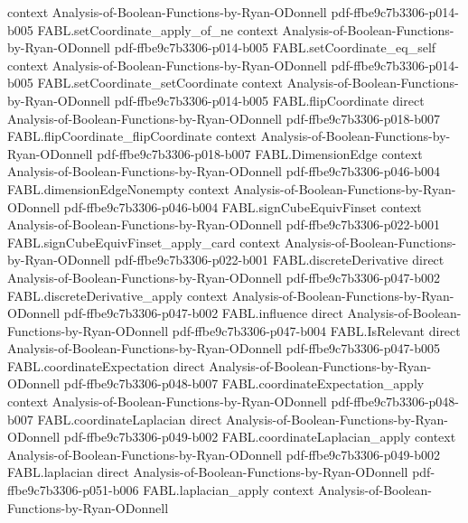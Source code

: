 \begin{theorem}
  {context}
  {Analysis-of-Boolean-Functions-by-Ryan-ODonnell}
  {pdf-ffbe9c7b3306-p014-b005}
\proofstep
  {FABL.setCoordinate_apply_of_ne}
  {context}
  {Analysis-of-Boolean-Functions-by-Ryan-ODonnell}
  {pdf-ffbe9c7b3306-p014-b005}
\proofstep
  {FABL.setCoordinate_eq_self}
  {context}
  {Analysis-of-Boolean-Functions-by-Ryan-ODonnell}
  {pdf-ffbe9c7b3306-p014-b005}
\proofstep
  {FABL.setCoordinate_setCoordinate}
  {context}
  {Analysis-of-Boolean-Functions-by-Ryan-ODonnell}
  {pdf-ffbe9c7b3306-p014-b005}
\proofstep
  {FABL.flipCoordinate}
  {direct}
  {Analysis-of-Boolean-Functions-by-Ryan-ODonnell}
  {pdf-ffbe9c7b3306-p018-b007}
\proofstep
  {FABL.flipCoordinate_flipCoordinate}
  {context}
  {Analysis-of-Boolean-Functions-by-Ryan-ODonnell}
  {pdf-ffbe9c7b3306-p018-b007}
\proofstep
  {FABL.DimensionEdge}
  {context}
  {Analysis-of-Boolean-Functions-by-Ryan-ODonnell}
  {pdf-ffbe9c7b3306-p046-b004}
\proofstep
  {FABL.dimensionEdgeNonempty}
  {context}
  {Analysis-of-Boolean-Functions-by-Ryan-ODonnell}
  {pdf-ffbe9c7b3306-p046-b004}
\proofstep
  {FABL.signCubeEquivFinset}
  {context}
  {Analysis-of-Boolean-Functions-by-Ryan-ODonnell}
  {pdf-ffbe9c7b3306-p022-b001}
\proofstep
  {FABL.signCubeEquivFinset_apply_card}
  {context}
  {Analysis-of-Boolean-Functions-by-Ryan-ODonnell}
  {pdf-ffbe9c7b3306-p022-b001}
\proofstep
  {FABL.discreteDerivative}
  {direct}
  {Analysis-of-Boolean-Functions-by-Ryan-ODonnell}
  {pdf-ffbe9c7b3306-p047-b002}
\proofstep
  {FABL.discreteDerivative_apply}
  {context}
  {Analysis-of-Boolean-Functions-by-Ryan-ODonnell}
  {pdf-ffbe9c7b3306-p047-b002}
\proofstep
  {FABL.influence}
  {direct}
  {Analysis-of-Boolean-Functions-by-Ryan-ODonnell}
  {pdf-ffbe9c7b3306-p047-b004}
\proofstep
  {FABL.IsRelevant}
  {direct}
  {Analysis-of-Boolean-Functions-by-Ryan-ODonnell}
  {pdf-ffbe9c7b3306-p047-b005}
\proofstep
  {FABL.coordinateExpectation}
  {direct}
  {Analysis-of-Boolean-Functions-by-Ryan-ODonnell}
  {pdf-ffbe9c7b3306-p048-b007}
\proofstep
  {FABL.coordinateExpectation_apply}
  {context}
  {Analysis-of-Boolean-Functions-by-Ryan-ODonnell}
  {pdf-ffbe9c7b3306-p048-b007}
\proofstep
  {FABL.coordinateLaplacian}
  {direct}
  {Analysis-of-Boolean-Functions-by-Ryan-ODonnell}
  {pdf-ffbe9c7b3306-p049-b002}
\proofstep
  {FABL.coordinateLaplacian_apply}
  {context}
  {Analysis-of-Boolean-Functions-by-Ryan-ODonnell}
  {pdf-ffbe9c7b3306-p049-b002}
\proofstep
  {FABL.laplacian}
  {direct}
  {Analysis-of-Boolean-Functions-by-Ryan-ODonnell}
  {pdf-ffbe9c7b3306-p051-b006}
\proofstep
  {FABL.laplacian_apply}
  {context}
  {Analysis-of-Boolean-Functions-by-Ryan-ODonnell}

\end{theorem}

